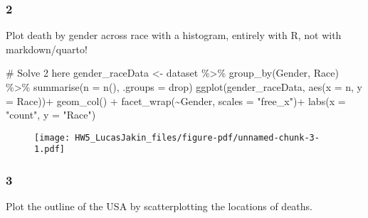 \documentclass[
  letterpaper,
  DIV=11,
  numbers=noendperiod]{scrartcl}
\newenvironment{Shaded}{\begin{snugshade}}{\end{snugshade}}
\newcommand{\AttributeTok}[1]{\textcolor[rgb]{0.40,0.45,0.13}{#1}}
\newcommand{\CommentTok}[1]{\textcolor[rgb]{0.37,0.37,0.37}{#1}}
\newcommand{\FunctionTok}[1]{\textcolor[rgb]{0.28,0.35,0.67}{#1}}
\newcommand{\NormalTok}[1]{\textcolor[rgb]{0.00,0.23,0.31}{#1}}
\newcommand{\OtherTok}[1]{\textcolor[rgb]{0.00,0.23,0.31}{#1}}
\newcommand{\SpecialCharTok}[1]{\textcolor[rgb]{0.37,0.37,0.37}{#1}}
\newcommand{\StringTok}[1]{\textcolor[rgb]{0.13,0.47,0.30}{#1}}
\begin{document}
\hypertarget{section-1}{%
\subsubsection{2}\label{section-1}}

Plot death by gender across race with a histogram, entirely with R, not
with markdown/quarto!

\begin{Shaded}
\begin{Highlighting}[]
\CommentTok{\# Solve 2 here }
\NormalTok{gender\_raceData }\OtherTok{\textless{}{-}}\NormalTok{ dataset }\SpecialCharTok{\%\textgreater{}\%} \FunctionTok{group\_by}\NormalTok{(Gender, Race) }\SpecialCharTok{\%\textgreater{}\%} \FunctionTok{summarise}\NormalTok{(}\AttributeTok{n =} \FunctionTok{n}\NormalTok{(), }\AttributeTok{.groups =} \StringTok{\textquotesingle{}drop\textquotesingle{}}\NormalTok{)}
\FunctionTok{ggplot}\NormalTok{(gender\_raceData, }\FunctionTok{aes}\NormalTok{(}\AttributeTok{x =}\NormalTok{ n, }\AttributeTok{y =}\NormalTok{ Race))}\SpecialCharTok{+}
  \FunctionTok{geom\_col}\NormalTok{() }\SpecialCharTok{+}
  \FunctionTok{facet\_wrap}\NormalTok{(}\SpecialCharTok{\textasciitilde{}}\NormalTok{Gender, }\AttributeTok{scales =} \StringTok{"free\_x"}\NormalTok{)}\SpecialCharTok{+}
  \FunctionTok{labs}\NormalTok{(}\AttributeTok{x =} \StringTok{"count"}\NormalTok{, }\AttributeTok{y =} \StringTok{"Race"}\NormalTok{) }
\end{Highlighting}
\end{Shaded}

\begin{figure}[H]

{\centering \texttt{[image: HW5\_LucasJakin\_files/figure-pdf/unnamed-chunk-3-1.pdf]}

}

\end{figure}

\hypertarget{section-2}{%
\subsubsection{3}\label{section-2}}

Plot the outline of the USA by scatterplotting the locations of deaths.
\end{document}
